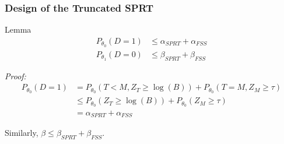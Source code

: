 \documentclass[10pt]{beamer}
\begin{document}
\begin{frame}
\frametitle{Design of the Truncated SPRT}

\begin{block}{Lemma}
\[
\begin{split}
P_{\theta_0}(D = 1) &\leq \alpha_{SPRT} + \alpha_{FSS} \\
P_{\theta_1}(D = 0) &\leq \beta_{SPRT} + \beta_{FSS}
\end{split}
\]
\end{block}

\textit{Proof:}
\[
\begin{split}
P_{\theta_0}(D = 1) &= P_{\theta_0}(T < M, Z_T \geq \log(B)) + P_{\theta_0}(T = M, Z_M \geq \tau) \\
    &\leq P_{\theta_0}(Z_T \geq \log(B)) + P_{\theta_0}(Z_M \geq \tau) \\
    &= \alpha_{SPRT} + \alpha_{FSS}
\end{split}
\]

Similarly, $\beta \leq \beta_{SPRT} + \beta_{FSS}$.

\end{frame}
\end{document}
